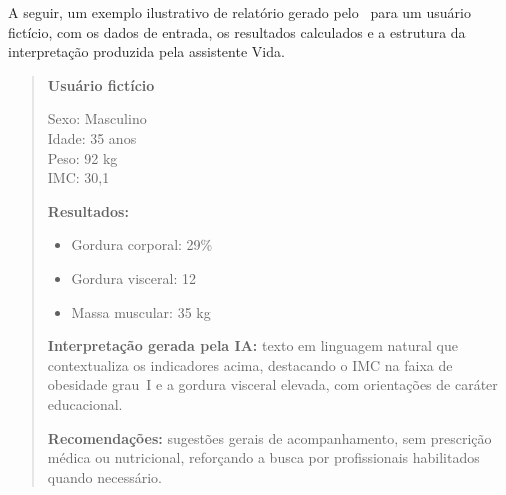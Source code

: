 A seguir, um exemplo ilustrativo de relatório gerado pelo \sintonia\ para um usuário
fictício, com os dados de entrada, os resultados calculados e a estrutura da interpretação
produzida pela assistente Vida.

\begin{quote}
\textbf{Usuário fictício}

Sexo: Masculino \\
Idade: 35 anos \\
Peso: 92 kg \\
IMC: 30,1

\textbf{Resultados:}
\begin{itemize}
    \item Gordura corporal: 29\%
    \item Gordura visceral: 12
    \item Massa muscular: 35 kg
\end{itemize}

\textbf{Interpretação gerada pela IA:} texto em linguagem natural que contextualiza os
indicadores acima, destacando o IMC na faixa de obesidade grau~I e a gordura visceral
elevada, com orientações de caráter educacional.

\textbf{Recomendações:} sugestões gerais de acompanhamento, sem prescrição médica ou
nutricional, reforçando a busca por profissionais habilitados quando necessário.
\end{quote}

